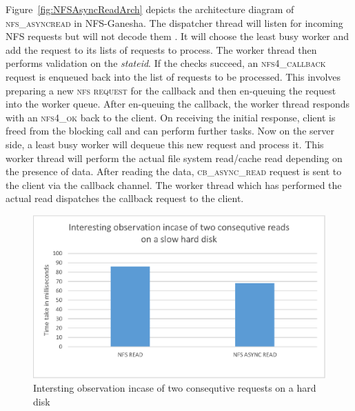  Figure~\ref{fig:NFSAsyncReadArch} depicts the architecture diagram \cite{NFSv4} of \textsc{nfs\_asyncread} in NFS-Ganesha. The dispatcher thread will listen for incoming NFS requests but will not decode them \cite{linuxsymp}. It will choose the least busy worker and add the request to its lists of requests to process. The worker thread then performs validation on the \textit{stateid}. If  the checks succeed, an \textsc{nfs4\_callback} request is enqueued back into the list of requests to be processed.  This involves preparing a new \textsc{nfs request} for the callback and then en-queuing the request into the worker queue. After en-queuing the callback, the worker thread responds with an \textsc{nfs4\_ok} back to the client. On receiving the initial response, client is freed from the blocking call and can perform further tasks. Now on the server side, a least busy worker will dequeue this new request and process it. This worker thread will perform the actual file system read/cache read depending on the presence of data. After reading the data, \textsc{cb\_async\_read} request is sent to the client via the callback channel. The worker thread which has performed the actual read dispatches the callback request to the client. 
 

\begin{figure}
\centering
\includegraphics[scale=1.0]{figures/InterstingObservation.eps}
\caption{Intersting observation incase of two consequtive requests on a hard disk}
\label{fig:InterstingObservation}
\end{figure}





 
 
 









